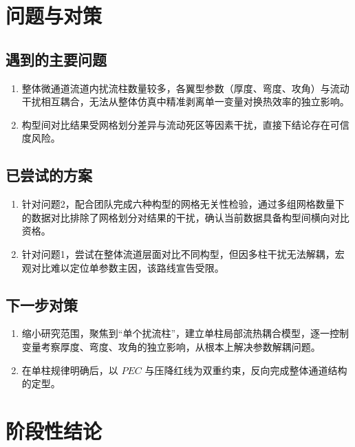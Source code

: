 \documentclass[stage2]{ydzjreport}
\begin{document}
\section{问题与对策}

\subsection{遇到的主要问题}

\begin{enumerate}
  \item 整体微通道流道内扰流柱数量较多，各翼型参数（厚度、弯度、攻角）与流动干扰相互耦合，无法从整体仿真中精准剥离单一变量对换热效率的独立影响。
  \item 构型间对比结果受网格划分差异与流动死区等因素干扰，直接下结论存在可信度风险。
\end{enumerate}

\subsection{已尝试的方案}

\begin{enumerate}
  \item 针对问题2，配合团队完成六种构型的网格无关性检验，通过多组网格数量下的数据对比排除了网格划分对结果的干扰，确认当前数据具备构型间横向对比资格。
  \item 针对问题1，尝试在整体流道层面对比不同构型，但因多柱干扰无法解耦，宏观对比难以定位单参数主因，该路线宣告受限。
\end{enumerate}

\subsection{下一步对策}

\begin{enumerate}
  \item 缩小研究范围，聚焦到“单个扰流柱”，建立单柱局部流热耦合模型，逐一控制变量考察厚度、弯度、攻角的独立影响，从根本上解决参数解耦问题。
  \item 在单柱规律明确后，以 $PEC$ 与压降红线为双重约束，反向完成整体通道结构的定型。
\end{enumerate}


\section{阶段性结论}
\end{document}
